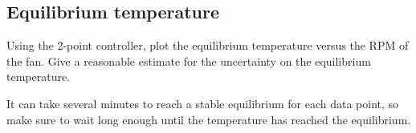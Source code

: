 \subsection{Equilibrium temperature}
\begin{task}
 Using the 2-point controller, plot the equilibrium temperature versus the \ac{RPM} of the fan. Give a reasonable estimate for the uncertainty on the equilibrium temperature.
\end{task}
%
\begin{note}
  It can take several minutes to reach a stable equilibrium for each data point, so make sure to wait long enough until the temperature has reached the equilibrium.
\end{note}
%
